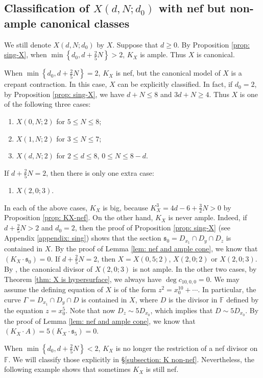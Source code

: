 \documentclass[a4paper,11pt]{amsart}
\newcommand{\FF}{\ensuremath{\mathbb{F}}}
\newcommand{\s}{\ensuremath{\mathfrak{s}}}
\theoremstyle{definition}
\theoremstyle{remark}
\numberwithin{equation}{section}
\begin{document}
\subsection{Classification of $X(d, N; d_0)$ with nef but non-ample canonical classes}
We still denote $X(d, N; d_0)$ by $X$. Suppose that $d \ge 0$. By Proposition \ref{prop: sing-X}, when $\min\left\{d_0, d + \frac25N\right\} > 2$, $K_X$ is ample. Thus $X$ is canonical. 

When $\min\left\{d_0, d + \frac25N\right\} = 2$, $K_X$ is nef, but the canonical model of $X$ is a crepant contraction. In this case, $X$ can be explicitly classified. In fact, if $d_0 = 2$, by Proposition \ref{prop: sing-X}, we have $d + N \le 8$ and $3d + N \ge 4$. Thus $X$ is one of the following three cases:
\begin{enumerate}
    \item $X(0,N;2)$ for $5 \le N \le 8$;
	\item $X(1,N;2)$ for $3 \le N \le 7$;
	\item $X(d,N;2)$ for $2 \le d \le 8$, $0\le N \le 8-d$.
\end{enumerate}
If $d + \frac25N = 2$, then there is only one extra case:
\begin{enumerate}
    \item [(4)] $X(2,0;3)$.
\end{enumerate}
In each of the above cases, $K_X$ is big, because $K_X^3 = 4d - 6 + \frac{3}{2}N > 0$ by Proposition \ref{prop: KX-nef}. On the other hand, $K_X$ is never ample. Indeed, if $d + \frac25N > 2$ and $d_0 = 2$, then the proof of Proposition \ref{prop: sing-X} (see Appendix \ref{appendix: sing}) shows that the section $\s_0 = D_{x_1} \cap D_y \cap D_z$ is contained in $X$. By the proof of Lemma \ref{lem: nef and ample cone}, we know that $(K_X \cdot \s_0) = 0$. If $d + \frac25N = 2$, then $X = X(0,5;2)$, $X(2,0;2)$ or $X(2,0;3)$. By \cite[Example 1.12]{CP}, the canonical divisor of $X(2,0;3)$ is not ample. In the other two cases, by Theorem \ref{thm: X is hypersurface}, we always have $\deg c_{10,0,0} = 0$. We may assume the defining equation of $X$ is of the form $z^2 = x_0^{10} + \cdots$. In particular, the curve $\Gamma = D_{x_1} \cap D_{y} \cap D$ is contained in $X$, where $D$ is the divisor in $\FF$ defined by the equation $z = x_0^5$. Note that now $D_z \sim 5D_{x_0}$, which implies that $D \sim 5D_{x_0}$. By the proof of Lemma \ref{lem: nef and ample cone}, we know that $(K_X \cdot A) = 5(K_X \cdot \s_5) = 0$.

When $\min\left\{d_0, d + \frac25N\right\} < 2$, $K_X$ is no longer the restriction of a nef divisor on $\FF$. We will classify those explicitly in \S \ref{subsection: K non-nef}. Nevertheless, the following example shows that sometimes $K_X$ is still nef. 
\end{document}
